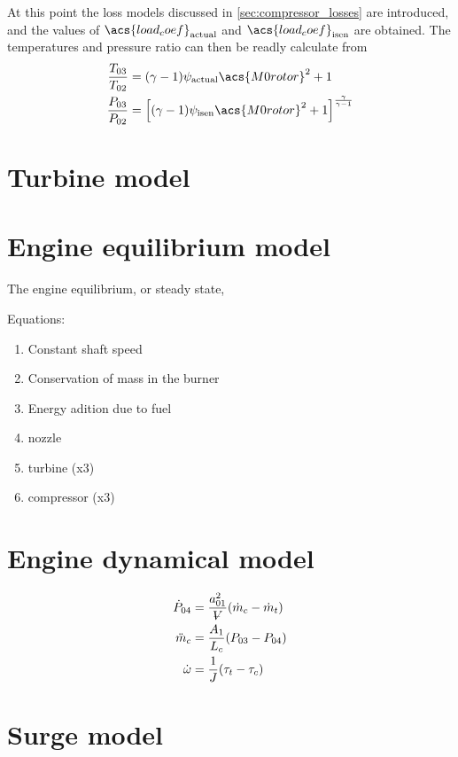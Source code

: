 \documentclass[tcc]{subfiles}
\begin{document}
At this point the loss models discussed in \cref{sec:compressor_losses} are introduced, 
and the values of $\acs{load_coef}_{\text{actual}}$ and $\acs{load_coef}_{\text{isen}}$ are obtained.
The temperatures and pressure ratio can then be readly calculate from
\begin{align}
    \label{eqn:psi2Tratio}
    \frac{T_{03}}{T_{02}} &= (\gamma - 1)\psi_{\text{actual}} \acs{M0rotor}^2 + 1 \\
    \label{eqn:psi2Pratio}
    \frac{P_{03}}{P_{02}} &= \left[(\gamma - 1)\psi_{\text{isen}} \acs{M0rotor}^2 + 1\right]^\frac{\gamma}{\gamma-1}
\end{align}


\section{Turbine model}





\section{Engine equilibrium model}


The engine equilibrium, or steady state, 


Equations:
\begin{enumerate}
    \item Constant shaft speed
    \item Conservation of mass in the burner
    \item Energy adition due to fuel
    \item nozzle
    \item turbine (x3)
    \item compressor (x3)
\end{enumerate}

\section{Engine dynamical model}
\begin{align}
    \dot{P}_{04} &= \frac{a_{01}^2}{\volume}(\dot{m}_c - \dot{m}_t) \\
    \ddot{m}_c &= \frac{A_1}{L_c}(P_{03}-P_{04}) \\
    \dot{\omega} &= \frac{1}{J} (\tau_t-\tau_c)
\end{align}

\section{Surge model}
\end{document}
